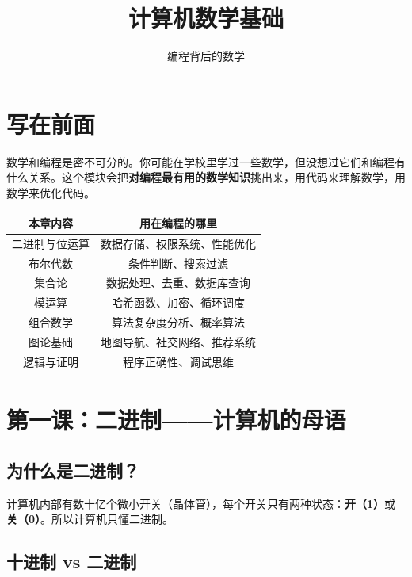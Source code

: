 \documentclass[a4paper,12pt]{ctexart}
\title{\textcolor{blue!70!black}{\Huge\textbf{计算机数学基础}}}
\author{编程背后的数学}
\date{}
\begin{document}
\maketitle
\thispagestyle{empty}

\section*{写在前面}

数学和编程是密不可分的。你可能在学校里学过一些数学，但没想过它们和编程有什么关系。这个模块会把\textbf{对编程最有用的数学知识}挑出来，用代码来理解数学，用数学来优化代码。

\begin{center}
\begin{tabular}{|c|c|}
\hline
\textbf{本章内容} & \textbf{用在编程的哪里} \\ \hline
二进制与位运算 & 数据存储、权限系统、性能优化 \\ \hline
布尔代数 & 条件判断、搜索过滤 \\ \hline
集合论 & 数据处理、去重、数据库查询 \\ \hline
模运算 & 哈希函数、加密、循环调度 \\ \hline
组合数学 & 算法复杂度分析、概率算法 \\ \hline
图论基础 & 地图导航、社交网络、推荐系统 \\ \hline
逻辑与证明 & 程序正确性、调试思维 \\ \hline
\end{tabular}
\end{center}

\section*{第一课：二进制——计算机的母语}

\subsection*{为什么是二进制？}

计算机内部有数十亿个微小开关（晶体管），每个开关只有两种状态：\textbf{开（1）}或\textbf{关（0）}。所以计算机只懂二进制。

\subsection*{十进制 vs 二进制}
\end{document}
